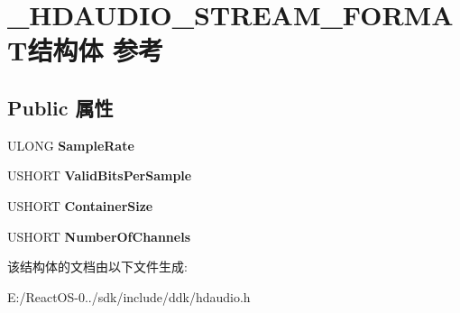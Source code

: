 \hypertarget{struct___h_d_a_u_d_i_o___s_t_r_e_a_m___f_o_r_m_a_t}{}\section{\+\_\+\+H\+D\+A\+U\+D\+I\+O\+\_\+\+S\+T\+R\+E\+A\+M\+\_\+\+F\+O\+R\+M\+A\+T结构体 参考}
\label{struct___h_d_a_u_d_i_o___s_t_r_e_a_m___f_o_r_m_a_t}
\subsection*{Public 属性}
\begin{DoxyCompactItemize}
\item 
\mbox{\label{struct___h_d_a_u_d_i_o___s_t_r_e_a_m___f_o_r_m_a_t_a7be06c14de70aca34444e4944af18fc8}} 
U\+L\+O\+NG {\bfseries Sample\+Rate}
\item 
\mbox{\label{struct___h_d_a_u_d_i_o___s_t_r_e_a_m___f_o_r_m_a_t_a4dc4973696db7efa9de6b3062f441a2a}} 
U\+S\+H\+O\+RT {\bfseries Valid\+Bits\+Per\+Sample}
\item 
\mbox{\label{struct___h_d_a_u_d_i_o___s_t_r_e_a_m___f_o_r_m_a_t_af3f9564bc1eb75f8f52b28f290f106fd}} 
U\+S\+H\+O\+RT {\bfseries Container\+Size}
\item 
\mbox{\label{struct___h_d_a_u_d_i_o___s_t_r_e_a_m___f_o_r_m_a_t_a51fd37e1f81026b5f9935df6e710adb2}} 
U\+S\+H\+O\+RT {\bfseries Number\+Of\+Channels}
\end{DoxyCompactItemize}


该结构体的文档由以下文件生成\+:\begin{DoxyCompactItemize}
\item 
E\+:/\+React\+O\+S-\/0../sdk/include/ddk/hdaudio.\+h\end{DoxyCompactItemize}
